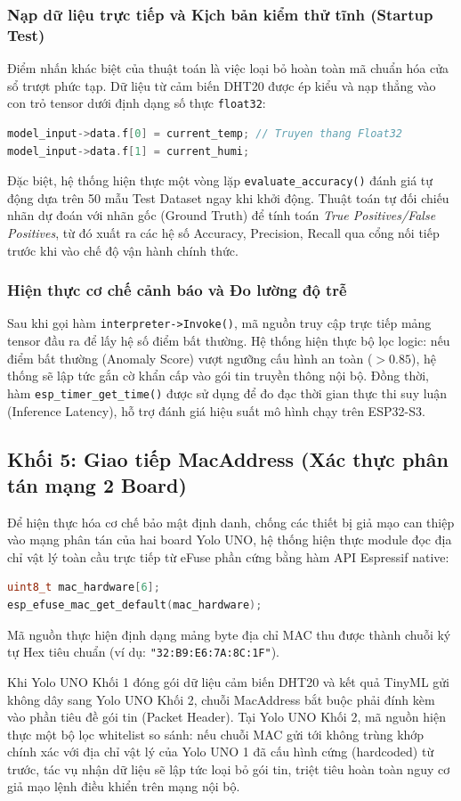 \subsubsection{Nạp dữ liệu trực tiếp và Kịch bản kiểm thử tĩnh (Startup Test)}
Điểm nhấn khác biệt của thuật toán là việc loại bỏ hoàn toàn mã chuẩn hóa cửa sổ trượt phức tạp. Dữ liệu từ cảm biến DHT20 được ép kiểu và nạp thẳng vào con trỏ tensor dưới định dạng số thực \texttt{float32}:
\begin{lstlisting}[language=C++]
model_input->data.f[0] = current_temp; // Truyen thang Float32
model_input->data.f[1] = current_humi;
\end{lstlisting}
Đặc biệt, hệ thống hiện thực một vòng lặp \texttt{evaluate\_accuracy()} đánh giá tự động dựa trên 50 mẫu Test Dataset ngay khi khởi động. Thuật toán tự đối chiếu nhãn dự đoán với nhãn gốc (Ground Truth) để tính toán \textit{True Positives/False Positives}, từ đó xuất ra các hệ số Accuracy, Precision, Recall qua cổng nối tiếp trước khi vào chế độ vận hành chính thức.

\subsubsection{Hiện thực cơ chế cảnh báo và Đo lường độ trễ}
Sau khi gọi hàm \texttt{interpreter->Invoke()}, mã nguồn truy cập trực tiếp mảng tensor đầu ra để lấy hệ số điểm bất thường. Hệ thống hiện thực bộ lọc logic: nếu điểm bất thường (Anomaly Score) vượt ngưỡng cấu hình an toàn ($> 0.85$), hệ thống sẽ lập tức gắn cờ khẩn cấp vào gói tin truyền thông nội bộ. 
Đồng thời, hàm \texttt{esp\_timer\_get\_time()} được sử dụng để đo đạc thời gian thực thi suy luận (Inference Latency), hỗ trợ đánh giá hiệu suất mô hình chạy trên ESP32-S3.

\subsection{Khối 5: Giao tiếp MacAddress (Xác thực phân tán mạng 2 Board)}
Để hiện thực hóa cơ chế bảo mật định danh, chống các thiết bị giả mạo can thiệp vào mạng phân tán của hai board Yolo UNO, hệ thống hiện thực module đọc địa chỉ vật lý toàn cầu trực tiếp từ eFuse phần cứng bằng hàm API Espressif native:
\begin{lstlisting}[language=C++]
uint8_t mac_hardware[6];
esp_efuse_mac_get_default(mac_hardware);
\end{lstlisting}
Mã nguồn thực hiện định dạng mảng byte địa chỉ MAC thu được thành chuỗi ký tự Hex tiêu chuẩn (ví dụ: \texttt{"32:B9:E6:7A:8C:1F"}). 

Khi Yolo UNO Khối 1 đóng gói dữ liệu cảm biến DHT20 và kết quả TinyML gửi không dây sang Yolo UNO Khối 2, chuỗi MacAddress bắt buộc phải đính kèm vào phần tiêu đề gói tin (Packet Header). Tại Yolo UNO Khối 2, mã nguồn hiện thực một bộ lọc whitelist so sánh: nếu chuỗi MAC gửi tới không trùng khớp chính xác với địa chỉ vật lý của Yolo UNO 1 đã cấu hình cứng (hardcoded) từ trước, tác vụ nhận dữ liệu sẽ lập tức loại bỏ gói tin, triệt tiêu hoàn toàn nguy cơ giả mạo lệnh điều khiển trên mạng nội bộ.